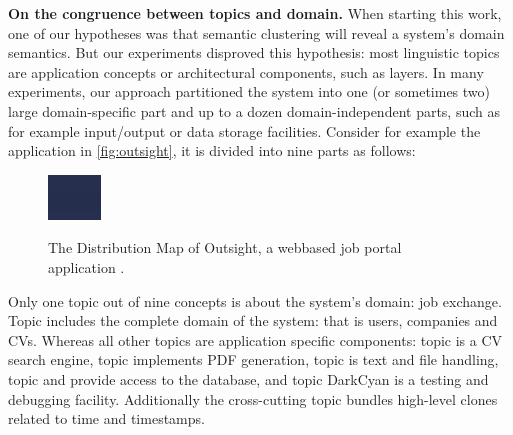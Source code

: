 \documentclass[10pt]{book}
\begin{document}
\textbf{On the congruence between topics and domain.} When starting this work, one of our hypotheses was that semantic clustering will reveal a system's domain semantics. But our experiments disproved this hypothesis: most linguistic topics are application concepts or architectural components, such as layers. In many experiments, our approach partitioned the system into one (or sometimes two) large domain-specific part and up to a dozen domain-independent parts, such as for example input/output or data storage facilities. Consider for example the application in \autoref{fig:outsight}, it is divided into nine parts as follows:

\begin{figure}[h]
  \includegraphics[width=\linewidth]{outsightDistribution}\\
  \caption{The Distribution Map of Outsight, a webbased job portal application \cite{Kuhn06a}.}\label{fig:outsight}
\end{figure}

Only one topic out of nine concepts is about the system's domain: job exchange. Topic \red includes the complete domain of the system: that is users, companies and CVs. Whereas all other topics are application specific components: topic \blue is a CV search engine, topic \darkgreen implements PDF generation, topic \green is text and file handling, topic \cyan and \magenta provide access to the database, and topic DarkCyan is a testing and debugging facility. Additionally the cross-cutting topic \yellow bundles high-level clones related to time and timestamps.
\end{document}
